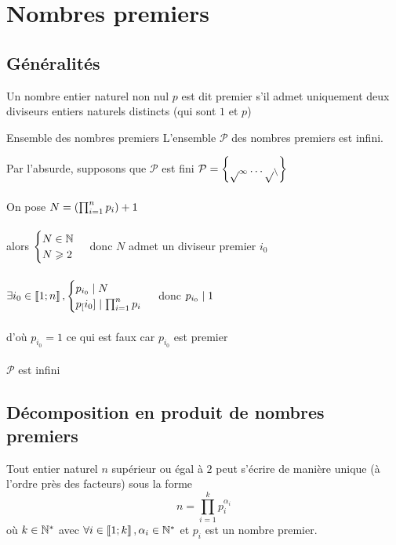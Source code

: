 \section{Nombres premiers}
\subsection{Généralités}
\begin{defi}
    Un nombre entier naturel non nul \(p\) est dit premier s’il admet uniquement deux diviseurs entiers naturels distincts (qui sont \(1\) et \(p\))
\end{defi}

\begin{defprop}
    Ensemble des nombres premiers
L’ensemble \(\mathcal{P}\) des nombres premiers est infini.
\end{defprop}
\begin{dem}
    Par l'absurde, supposons que \(\mathcal{P}\) est fini \cad \(\mathcal{P = \left\lbrace p_1 \dots p_n\right\rbrace}\)\\~\\
    On pose \(N = \left(\prod_{i = 1}^{n} p_i\right) + 1\)\\~\\
    alors \(\begin{cases}
        N \in \mathbb{N} \\
        N \geqslant 2
    \end{cases}\) donc \(N\) admet un diviseur premier \(i_0\) \\~\\
    \(\exists i_0 \in \left\llbracket1;n\right\rrbracket , \begin{cases}
        p_{i_0} \mid N \\
        p_[i_0] \mid \prod_{i=1}^{n} p_i
    \end{cases}\) donc \(p_{i_0} \mid 1\)\\~\\
    d'où \(p_{i_0} = 1\) ce qui est faux car \(p_{i_0}\) est premier\\~\\
    \conclusion \(\mathcal{P}\) est infini    
\end{dem}
\subsection{Décomposition en produit de nombres premiers}

\begin{theo}
    Tout entier naturel \(n\) supérieur ou égal à \(2\) peut s’écrire de manière unique (à l’ordre près des facteurs) sous la forme
    \[n = \prod_{i=1}^{k} p_i^{\alpha_i}\]
    où \(k \in \mathbb{N}^*\) avec \(\forall i \in \left\llbracket1;k\right\rrbracket , \alpha_i \in \mathbb{N}^*\) et \(p_i\) est un nombre premier.
\end{theo}

